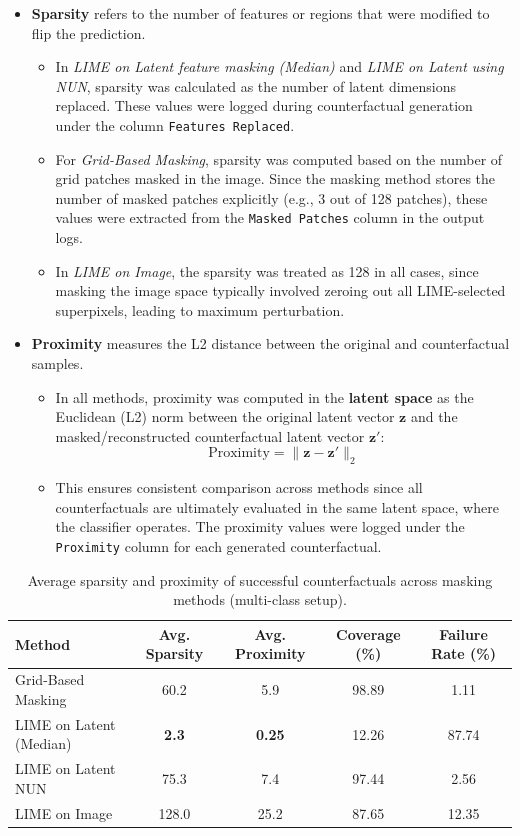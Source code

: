 \begin{itemize}
    \item \textbf{Sparsity} refers to the number of features or regions that were modified to flip the prediction. 
    \begin{itemize}
        \item In \textit{LIME on Latent feature masking (Median)} and \textit{LIME on Latent using NUN}, sparsity was calculated as the number of latent dimensions replaced. These values were logged during counterfactual generation under the column \texttt{Features Replaced}.
        \item For \textit{Grid-Based Masking}, sparsity was computed based on the number of grid patches masked in the image. Since the masking method stores the number of masked patches explicitly (e.g., 3 out of 128 patches), these values were extracted from the \texttt{Masked Patches} column in the output logs.
        \item In \textit{LIME on Image}, the sparsity was treated as 128 in all cases, since masking the image space typically involved zeroing out all LIME-selected superpixels, leading to maximum perturbation.
    \end{itemize}
    
    \item \textbf{Proximity} measures the L2 distance between the original and counterfactual samples. 
    \begin{itemize}
        \item In all methods, proximity was computed in the \textbf{latent space} as the Euclidean (L2) norm between the original latent vector $\mathbf{z}$ and the masked/reconstructed counterfactual latent vector $\mathbf{z'}$:
        \[
        \text{Proximity} = \|\mathbf{z} - \mathbf{z'}\|_2
        \]
        \item This ensures consistent comparison across methods since all counterfactuals are ultimately evaluated in the same latent space, where the classifier operates. The proximity values were logged under the \texttt{Proximity} column for each generated counterfactual.
    \end{itemize}
\end{itemize}

\begin{table}[htbp]
\centering
\small
\begin{tabular}{lcccc}
\toprule
\textbf{Method} & \textbf{Avg. Sparsity} & \textbf{Avg. Proximity} & \textbf{Coverage (\%)} & \textbf{Failure Rate (\%)} \\
\midrule
Grid-Based Masking       & 60.2    & 5.9   & 98.89 & 1.11 \\
LIME on Latent (Median)  & \textbf{2.3}     & \textbf{0.25}  & 12.26 & 87.74 \\
LIME on Latent NUN       & 75.3    & 7.4   & 97.44 & 2.56 \\
LIME on Image            & 128.0   & 25.2  & 87.65 & 12.35 \\
\bottomrule
\end{tabular}
\caption{Average sparsity and proximity of successful counterfactuals across masking methods (multi-class setup).}
\label{tab:sparsity_proximity}
\end{table}

